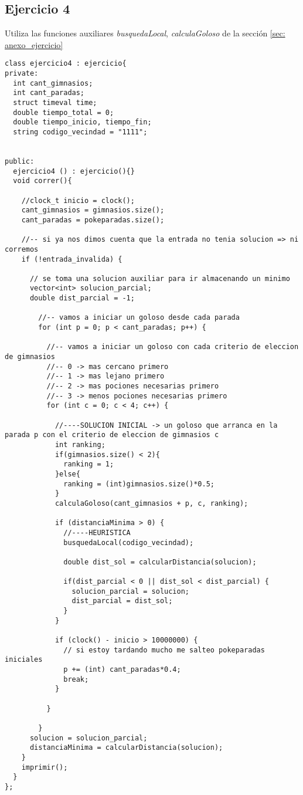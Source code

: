 \subsection{Ejercicio 4}
\label{sec: anexo_ejercicio4}
\par Utiliza las funciones auxiliares \textit{busquedaLocal}, \textit{calculaGoloso} de la sección \ref{sec: anexo_ejercicio}
\begin{lstlisting}
class ejercicio4 : ejercicio{
private:
  int cant_gimnasios;
  int cant_paradas;
  struct timeval time;
  double tiempo_total = 0;
  double tiempo_inicio, tiempo_fin;
  string codigo_vecindad = "1111";


public:
  ejercicio4 () : ejercicio(){}
  void correr(){
    
    //clock_t inicio = clock();
    cant_gimnasios = gimnasios.size();
    cant_paradas = pokeparadas.size();

    //-- si ya nos dimos cuenta que la entrada no tenia solucion => ni corremos
    if (!entrada_invalida) {

      // se toma una solucion auxiliar para ir almacenando un minimo
      vector<int> solucion_parcial;
      double dist_parcial = -1;

        //-- vamos a iniciar un goloso desde cada parada
        for (int p = 0; p < cant_paradas; p++) {

          //-- vamos a iniciar un goloso con cada criterio de eleccion de gimnasios
          //-- 0 -> mas cercano primero
          //-- 1 -> mas lejano primero
          //-- 2 -> mas pociones necesarias primero
          //-- 3 -> menos pociones necesarias primero
          for (int c = 0; c < 4; c++) {

            //----SOLUCION INICIAL -> un goloso que arranca en la parada p con el criterio de eleccion de gimnasios c
            int ranking;
            if(gimnasios.size() < 2){
              ranking = 1;
            }else{
              ranking = (int)gimnasios.size()*0.5;
            }
            calculaGoloso(cant_gimnasios + p, c, ranking);

            if (distanciaMinima > 0) {
              //----HEURISTICA
              busquedaLocal(codigo_vecindad);

              double dist_sol = calcularDistancia(solucion);

              if(dist_parcial < 0 || dist_sol < dist_parcial) {
                solucion_parcial = solucion;
                dist_parcial = dist_sol;
              }
            }
            
            if (clock() - inicio > 10000000) {
              // si estoy tardando mucho me salteo pokeparadas iniciales
              p += (int) cant_paradas*0.4;
              break;
            }

          }

        }
      solucion = solucion_parcial;
      distanciaMinima = calcularDistancia(solucion);
    }
    imprimir();
  }
};
\end{lstlisting}